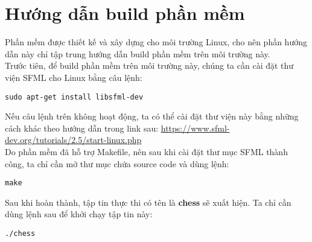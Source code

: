 \section{Hướng dẫn build phần mềm}
Phần mềm được thiết kế và xây dựng cho môi trường Linux, cho nên phần hướng dẫn này chỉ tập trung hướng dẫn build phần mềm trên môi trường này.\\
Trước tiên, để build phần mềm trên môi trường này, chúng ta cần cài đặt thư viện SFML cho Linux bằng câu lệnh:
\begin{lstlisting}
sudo apt-get install libsfml-dev
\end{lstlisting} 
Nếu câu lệnh trên không hoạt động, ta có thể cài đặt thư viện này bằng những cách khác theo hướng dẫn trong link sau: \url{https://www.sfml-dev.org/tutorials/2.5/start-linux.php}\\
Do phần mềm đã hỗ trợ Makefile, nên sau khi cài đặt thư mục SFML thành công, ta chỉ cần mở thư mục chứa source code và dùng lệnh:
\begin{lstlisting}
make
\end{lstlisting}
Sau khi hoàn thành, tập tin thực thi có tên là \textbf{chess} sẽ xuất hiện. Ta chỉ cần dùng lệnh sau để khởi chạy tập tin này:
\begin{lstlisting}
./chess
\end{lstlisting}